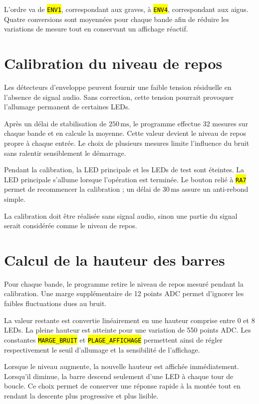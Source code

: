 \documentclass{report}
\let\OldTexttt\texttt
\renewcommand{\texttt}[1]{\OldTexttt{\hl{#1}}}
\begin{document}
L'ordre va de \texttt{ENV1}, correspondant aux graves, à \texttt{ENV4},
correspondant aux aigus. Quatre conversions sont moyennées pour chaque bande
afin de réduire les variations de mesure tout en conservant un affichage
réactif.


\section{Calibration du niveau de repos}

Les détecteurs d'enveloppe peuvent fournir une faible tension résiduelle en
l'absence de signal audio. Sans correction, cette tension pourrait provoquer
l'allumage permanent de certaines LEDs.

Après un délai de stabilisation de \(250\,\mathrm{ms}\), le programme effectue
32 mesures sur chaque bande et en calcule la moyenne. Cette valeur devient le
niveau de repos propre à chaque entrée. Le choix de plusieurs mesures limite
l'influence du bruit sans ralentir sensiblement le démarrage.

Pendant la calibration, la LED principale et les LEDs de test sont éteintes.
La LED principale s'allume lorsque l'opération est terminée. Le bouton relié
à \texttt{RA7} permet de recommencer la calibration ; un délai de
\(30\,\mathrm{ms}\) assure un anti-rebond simple.

La calibration doit être réalisée sans signal audio, sinon une partie du
signal serait considérée comme le niveau de repos.


\section{Calcul de la hauteur des barres}

Pour chaque bande, le programme retire le niveau de repos mesuré pendant la
calibration. Une marge supplémentaire de 12 points ADC permet d'ignorer les
faibles fluctuations dues au bruit.

La valeur restante est convertie linéairement en une hauteur comprise entre
0 et 8 LEDs. La pleine hauteur est atteinte pour une variation de 550 points
ADC. Les constantes \texttt{MARGE\_BRUIT} et \texttt{PLAGE\_AFFICHAGE}
permettent ainsi de régler respectivement le seuil d'allumage et la
sensibilité de l'affichage.

Lorsque le niveau augmente, la nouvelle hauteur est affichée immédiatement.
Lorsqu'il diminue, la barre descend seulement d'une LED à chaque tour de
boucle. Ce choix permet de conserver une réponse rapide à la montée tout en
rendant la descente plus progressive et plus lisible.
\end{document}

